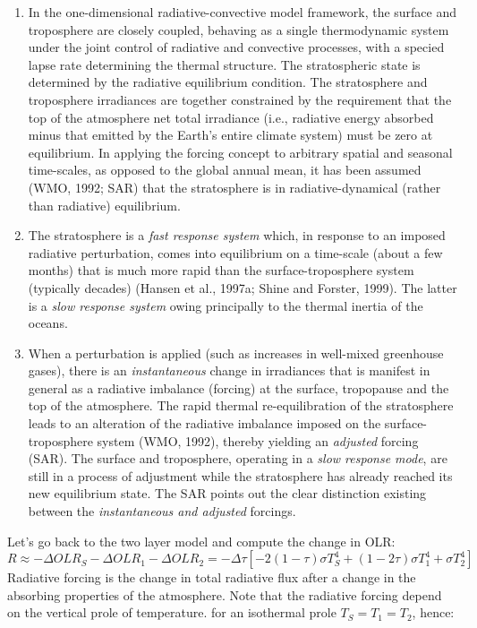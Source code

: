 \begin{enumerate}
	\item In the one-dimensional radiative-convective model framework, the surface and troposphere are closely coupled, behaving as a single thermodynamic system under the joint control of radiative and convective processes, with a specied lapse rate determining the thermal structure. The stratospheric state is determined by the radiative equilibrium condition. The stratosphere and troposphere irradiances are together constrained by the requirement that the top of the atmosphere net total irradiance (i.e., radiative energy absorbed minus that emitted by the Earth’s entire climate system) must be zero at equilibrium. In applying the forcing concept to arbitrary spatial and seasonal time-scales, as opposed to the global annual mean, it has been assumed (WMO, 1992; SAR) that the stratosphere is in radiative-dynamical (rather than radiative) equilibrium.
	\item The stratosphere is a \textit{fast response system} which, in response to an imposed radiative perturbation, comes into equilibrium on a time-scale (about a few months) that is much more rapid than the surface-troposphere system (typically decades) (Hansen et al., 1997a; Shine and Forster, 1999). The latter is a \textit{slow response system} owing principally to the thermal inertia of the oceans.
	\item When a perturbation is applied (such as increases in well-mixed greenhouse gases), there is an \textit{instantaneous} change in irradiances that is manifest in general as a radiative imbalance (forcing) at the surface, tropopause and the top of the atmosphere. The rapid thermal re-equilibration of the stratosphere leads to an alteration of the radiative imbalance imposed on the surface- troposphere system (WMO, 1992), thereby yielding an \textit{adjusted} forcing (SAR). The surface and troposphere, operating in a \textit{slow response mode}, are still in a process of adjustment while the stratosphere has already reached its new equilibrium state. The SAR points out the clear distinction existing between the \textit{instantaneous and adjusted} forcings.
\end{enumerate}
Let's go back to the two layer model and compute the change in OLR:
\begin{equation}
	R\approx-\Delta OLR_S-\Delta OLR_1-\Delta OLR_2=
	-\Delta \tau[-2(1-\tau)\sigma T_S^4+(1-2\tau)\sigma T_1^4+\sigma T_2^4]
\end{equation}
Radiative forcing is the change in total radiative flux after a change in the absorbing properties of the atmosphere. Note that the radiative forcing depend on the vertical prole of temperature. for an isothermal prole $T_S=T_1=T_2$, hence:
